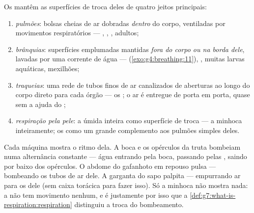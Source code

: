 \begin{definition}\label{def:g7:how-animals-breathe:four}
Os  mantêm as superfícies de troca deles de quatro jeitos
principais:
\begin{enumerate}
  \item \emph{pulmões}: bolsas cheias de ar dobradas
        \emph{dentro} do corpo, ventiladas por movimentos
        respiratórios --- , , ,  adultos;
  \item \emph{brânquias}: superfícies emplumadas
        mantidas \emph{fora do corpo ou na borda dele}, lavadas por
        uma corrente de água --- 
        (\cref{exo:g4:breathing:11}), , muitas larvas
        aquáticas, mexilhões;
  \item \emph{traqueias}: uma rede de tubos
        finos de ar canalizados de aberturas ao longo do corpo direto
        para cada órgão --- os ; o ar é entregue de porta em
        porta, quase sem a ajuda do ;
  \item \emph{respiração pela pele}: a
         úmida inteira como superfície de troca --- a minhoca
        inteiramente; os  como um grande complemento aos
        pulmões simples deles.
\end{enumerate}
\end{definition}

\begin{example}\label{ex:g7:how-animals-breathe:watch}
Cada máquina mostra o ritmo dela. A boca e os opérculos da truta
bombeiam numa alternância constante --- água entrando pela boca,
passando pelas , saindo por baixo dos opérculos. O abdome do
gafanhoto em repouso pulsa --- bombeando os tubos de ar dele. A
garganta do sapo palpita --- empurrando ar para os  dele (sem
caixa torácica para fazer isso). Só a minhoca não mostra nada: a
 não tem movimento nenhum, e é justamente por isso
que a \cref{def:g7:what-is-respiration:respiration} distinguiu a troca
do bombeamento.
\end{example}

